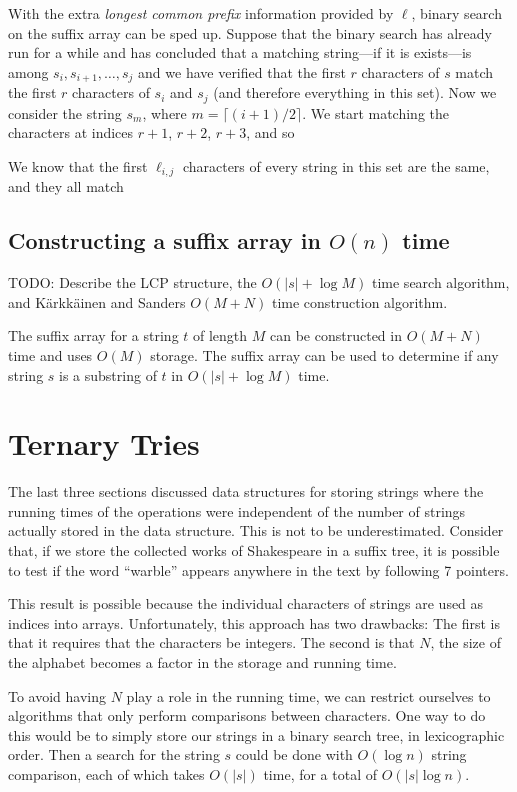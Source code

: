 With the extra \emph{longest common prefix} information provided by $\ell$, binary search on the suffix array can be sped up.  Suppose that the binary search has already run for a while and has concluded that a matching string---if it is exists---is among $s_i,s_{i+1},\ldots,s_j$ and we have verified that
the first $r$ characters of $s$ match the first $r$ characters of $s_i$ and $s_j$ (and therefore everything in this set).   Now we consider the string $s_m$, where $m=\lceil(i+1)/2\rceil$.  We start matching the characters at
indices $r+1$, $r+2$, $r+3$, and so


We know that the first $\ell_{i,j}$ characters of every string in this set are the same, and they all match 


\subsection{Constructing a suffix array in $O(n)$ time}


TODO: Describe the LCP structure, the $O(|s|+\log M)$ time search algorithm,
and K\"arkk\"ainen and Sanders $O(M+N)$ time construction algorithm.

\begin{thm}
The suffix array for a string $t$ of length $M$ can be constructed in
$O(M+N)$ time and uses $O(M)$ storage.  The suffix array can be used to
determine if any string $s$ is a substring of $t$ in $O(|s|+\log M)$ time.
\end{thm}


\section{Ternary Tries}

The last three sections discussed data structures for storing strings
where the running times of the operations were independent of the
number of strings actually stored in the data structure.  This is not
to be underestimated.  Consider that, if we store the collected works
of Shakespeare in a suffix tree, it is possible to test if the word
``warble'' appears anywhere in the text by following 7 pointers.

This result is possible because the individual characters of strings
are used as indices into arrays.  Unfortunately, this approach has
two drawbacks: The first is that it requires that the characters be
integers.  The second is that $N$, the size of the alphabet becomes a
factor in the storage and running time.

To avoid having $N$ play a role in the running time, we can restrict
ourselves to algorithms that only perform comparisons between
characters.  One way to do this would be to simply store our strings
in a binary search tree, in lexicographic order.  Then a search for
the string $s$ could be done with $O(\log n)$ string comparison, each
of which takes $O(|s|)$ time, for a total of $O(|s|\log n)$.

